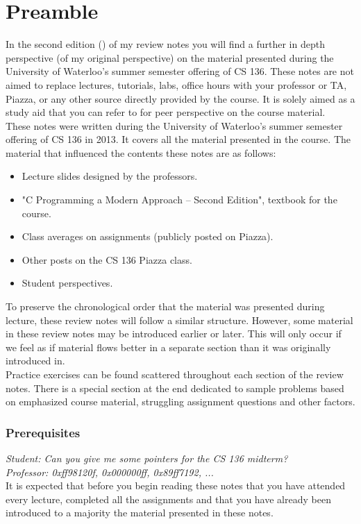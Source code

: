 \section*{Preamble}

In the second edition (\docbuild) of my review notes you will find a further in depth perspective (of my original perspective) on the material presented during the University of Waterloo's summer semester offering of CS 136. These notes are not aimed to replace lectures, tutorials, labs, office hours with your professor or TA, Piazza, or any other source directly provided by the course. It is solely aimed as a study aid that you can refer to for peer perspective on the course material.\\

These notes were written during the University of Waterloo's summer semester offering of CS 136 in 2013. It covers all the material presented in the course. The material that influenced the contents these notes are as follows:

\begin{itemize}

\item Lecture slides designed by the professors.
\item "C Programming a Modern Approach -- Second Edition", textbook for the course.
\item Class averages on assignments (publicly posted on Piazza).
\item Other posts on the CS 136 Piazza class.
\item Student perspectives.

\end{itemize}

To preserve the chronological order that the material was presented during lecture, these review notes will follow a similar structure. However, some material in these review notes may be introduced earlier or later. This will only occur if we feel as if material flows better in a separate section than it was originally introduced in.\\

Practice exercises can be found scattered throughout each section of the review notes. There is a special section at the end dedicated to sample problems based on emphasized course material, struggling assignment questions and other factors.

\subsubsection*{Prerequisites}

\textit{Student: Can you give me some pointers for the CS 136 midterm?}\\
\textit{Professor: 0xff98120f, 0x000000ff, 0x89ff7192, ...}\\

It is expected that before you begin reading these notes that you have attended every lecture, completed all the assignments and that you have already been introduced to a majority the material presented in these notes.
